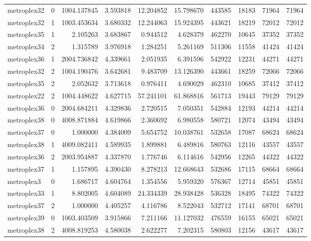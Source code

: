 \begin{longtable}{|l|r|r|r|r|r|r|r|r|r|}
metroplex32 & 0 & 1004.137845 & 3.593818 & 12.204852 & 15.798670 & 443585 & 18183 & 71964 & 71964 \\
metroplex32 & 1 & 1003.453634 & 3.680332 & 12.244063 & 15.924395 & 443621 & 18219 & 72012 & 72012 \\
metroplex35 & 1 & 2.105263 & 3.683867 & 0.944512 & 4.628379 & 462270 & 10645 & 37352 & 37352 \\
metroplex34 & 2 & 1.315789 & 3.976918 & 1.284251 & 5.261169 & 511306 & 11558 & 41424 & 41424 \\
metroplex36 & 1 & 2004.736842 & 4.339661 & 2.051935 & 6.391596 & 542922 & 12231 & 44271 & 44271 \\
metroplex32 & 2 & 1004.190476 & 3.642681 & 9.483709 & 13.126390 & 443661 & 18259 & 72066 & 72066 \\
metroplex35 & 2 & 2.052632 & 3.713618 & 0.976411 & 4.690029 & 462310 & 10685 & 37412 & 37412 \\
metroplex22 & 2 & 1004.448622 & 4.627715 & 57.241101 & 61.868816 & 561713 & 19443 & 79129 & 79129 \\
metroplex36 & 0 & 2004.684211 & 4.329836 & 2.720515 & 7.050351 & 542884 & 12193 & 44214 & 44214 \\
metroplex38 & 0 & 4008.871884 & 4.619866 & 2.360692 & 6.980558 & 580721 & 12074 & 43494 & 43494 \\
metroplex37 & 0 & 1.000000 & 4.384009 & 5.654752 & 10.038761 & 532658 & 17087 & 68624 & 68624 \\
metroplex38 & 1 & 4009.082411 & 4.589935 & 1.899881 & 6.489816 & 580763 & 12116 & 43557 & 43557 \\
metroplex36 & 2 & 2003.954887 & 4.337870 & 1.776746 & 6.114616 & 542956 & 12265 & 44322 & 44322 \\
metroplex37 & 1 & 1.157895 & 4.390430 & 8.278213 & 12.668643 & 532686 & 17115 & 68664 & 68664 \\
metroplex3 & 0 & 1.686717 & 4.604764 & 1.354556 & 5.959320 & 576367 & 12714 & 45851 & 45851 \\
metroplex33 & 1 & 8.802005 & 4.604089 & 24.334339 & 28.938428 & 536328 & 18495 & 74322 & 74322 \\
metroplex37 & 2 & 1.000000 & 4.405257 & 4.116786 & 8.522043 & 532712 & 17141 & 68701 & 68701 \\
metroplex39 & 0 & 1003.403509 & 3.915866 & 7.211166 & 11.127032 & 476559 & 16155 & 65021 & 65021 \\
metroplex38 & 2 & 4008.819253 & 4.580038 & 2.622277 & 7.202315 & 580803 & 12156 & 43617 & 43617 \\

\end{longtable}
